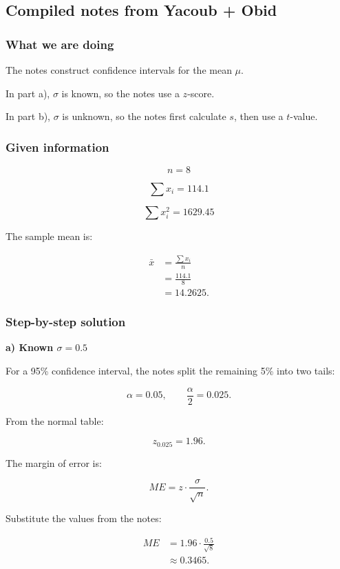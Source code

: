 \documentclass[10pt]{article}
\begin{document}
\subsection*{Compiled notes from Yacoub + Obid}

\subsubsection*{What we are doing}
The notes construct confidence intervals for the
mean \(\mu\).

In part a), \(\sigma\) is known, so the notes use
a \(z\)-score.

In part b), \(\sigma\) is unknown, so the notes first
calculate \(s\), then use a \(t\)-value.

\subsubsection*{Given information}
\[
n=8
\]

\[
\sum x_i=114.1
\]

\[
\sum x_i^2=1629.45
\]

The sample mean is:

\begin{align*}
\bar{x}
&=\frac{\sum x_i}{n} \\[2mm]
&=\frac{114.1}{8} \\[2mm]
&=14.2625.
\end{align*}

\subsubsection*{Step-by-step solution}

\textbf{a) Known \(\sigma=0.5\)}

For a 95\% confidence interval, the notes split
the remaining 5\% into two tails:

\[
\alpha=0.05,
\qquad
\frac{\alpha}{2}=0.025.
\]

From the normal table:

\[
z_{0.025}=1.96.
\]

The margin of error is:

\[
ME=z\cdot \frac{\sigma}{\sqrt{n}}.
\]

Substitute the values from the notes:

\begin{align*}
ME
&=1.96\cdot \frac{0.5}{\sqrt{8}} \\[2mm]
&\approx 0.3465.
\end{align*}
\end{document}
